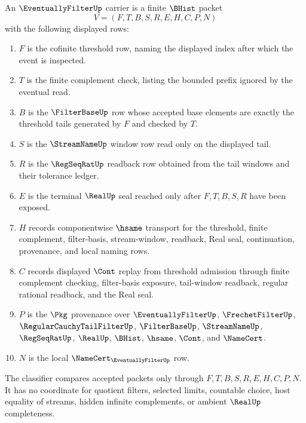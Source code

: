\begin{definition}
\label{def:eventually-filter-carrier}
An $\EventuallyFilterUp$ carrier is a finite $\BHist$ packet
$$
V=(F,T,B,S,R,E,H,C,P,N)
$$
with the following displayed rows:
\begin{enumerate}
\item $F$ is the cofinite threshold row, naming the displayed index after which the event is inspected.
\item $T$ is the finite complement check, listing the bounded prefix ignored by the eventual read.
\item $B$ is the $\FilterBaseUp$ row whose accepted base elements are exactly the threshold tails generated by $F$ and checked by $T$.
\item $S$ is the $\StreamNameUp$ window row read only on the displayed tail.
\item $R$ is the $\RegSeqRatUp$ readback row obtained from the tail windows and their tolerance ledger.
\item $E$ is the terminal $\RealUp$ seal reached only after $F,T,B,S,R$ have been exposed.
\item $H$ records componentwise $\hsame$ transport for the threshold, finite complement, filter-basis, stream-window, readback, Real seal, continuation, provenance, and local naming rows.
\item $C$ records displayed $\Cont$ replay from threshold admission through finite complement checking, filter-basis exposure, tail-window readback, regular rational readback, and the Real seal.
\item $P$ is the $\Pkg$ provenance over $\EventuallyFilterUp$, $\FrechetFilterUp$, $\RegularCauchyTailFilterUp$, $\FilterBaseUp$, $\StreamNameUp$, $\RegSeqRatUp$, $\RealUp$, $\BHist$, $\hsame$, $\Cont$, and $\NameCert$.
\item $N$ is the local $\NameCert_{\EventuallyFilterUp}$ row.
\end{enumerate}
The classifier compares accepted packets only through $F,T,B,S,R,E,H,C,P,N$. It has no coordinate for quotient filters, selected limits, countable choice, host equality of streams, hidden infinite complements, or ambient $\RealUp$ completeness.
\end{definition}

